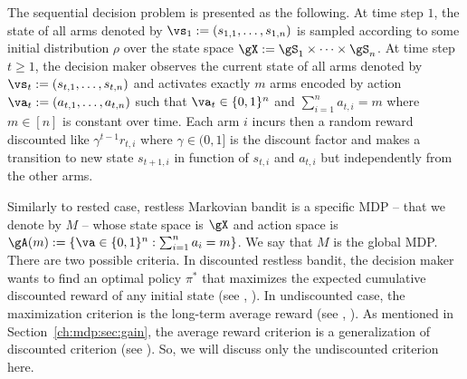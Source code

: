 The sequential decision problem is presented as the following.
At time step $1$, the state of all arms denoted by $\vs_1:=(s_{1,1},\dots,s_{1,n})$ is sampled according to some initial distribution $\rho$ over the state space $\gX:=\gS_1\times\dots\times\gS_n$.
At time step $t\ge1$, the decision maker observes the current state of all arms denoted by $\vs_t:=(s_{t,1},\dots,s_{t,n})$ and activates exactly $m$ arms encoded by action $\va_t:=(a_{t,1},\dots,a_{t,n})$ such that $\va_t\in\{0,1\}^n$ and $\sum_{i=1}^{n} a_{t,i}=m$ where $m\in[n]$ is constant over time.
Each arm $i$ incurs then a random reward discounted like $\gamma^{t-1}r_{t,i}$ where $\gamma\in(0,1]$ is the discount factor and makes
a transition to new state $s_{t+1,i}$ in function of $s_{t,i}$ and $a_{t,i}$ but independently from the other arms.

Similarly to rested case, restless Markovian bandit is a specific MDP -- that we denote by $M$ -- whose state space is $\gX$ and action space is $\gA(m):=\{\va\in\{0,1\}^n : \sum_{i=1}^{n}a_i =m\}$.
We say that $M$ is the global MDP.
There are two possible criteria.
In discounted restless bandit, the decision maker wants to find an optimal policy $\pi^*$ that maximizes the expected cumulative discounted reward of any initial state (see \eg, \cite{nino2007dynamic, fu2019towards, akbarzadeh2020conditions, nino2020fast}). 
In undiscounted case, the maximization criterion is the long-term average reward (see \eg, \cite{whittle1988restless, whittle1996optimal, papadimitriou1994complexity, gibson2021novel, avrachenkov2022whittle}).
As mentioned in Section~\ref{ch:mdp:sec:gain}, the average reward criterion is a generalization of discounted criterion (see ).
So, we will discuss only the undiscounted criterion here.

